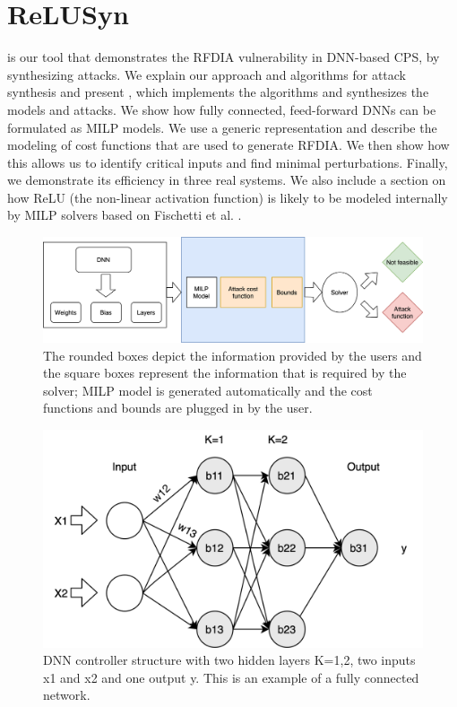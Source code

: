 \chapter{ReLUSyn}
\label{relusyn}
\tool is our tool that demonstrates the \ac{RFDIA} vulnerability in DNN-based \ac{CPS}, by synthesizing attacks.
We explain our approach and algorithms for attack synthesis and present \tool, which implements the algorithms and synthesizes the models and attacks. 
We show how fully connected, feed-forward \ac{DNN}s can be formulated as \ac{MILP} models. 
We use a generic representation and describe the modeling of cost functions that are used to generate \ac{RFDIA}.
We then show how this allows us to identify critical inputs and find minimal perturbations. 
Finally, we demonstrate its efficiency in three real systems. 
We also include a section on how ReLU (the non-linear activation function) is likely to be modeled internally by MILP solvers based on Fischetti et al. \cite{fischetti2017deep}. %


\begin{figure}
	\centering
	\includegraphics[scale=0.1]{Images/Methodology}
	\caption[Methodology]{The rounded boxes depict the information provided by the users and the square boxes represent the information that is required by the solver; MILP model is generated automatically and the cost functions and bounds are plugged in by the user.}
	\label{fig:methodology}
\end{figure}

\begin{figure}
	\centering
	\includegraphics[width=0.7\linewidth]{Images/DNNstructure}
	\caption[DNN structure]{DNN controller structure with two hidden layers K=1,2, two inputs x1 and x2 and one output y. This is an example of a fully connected network.}
	\label{fig:dnn-controller}
\end{figure}


